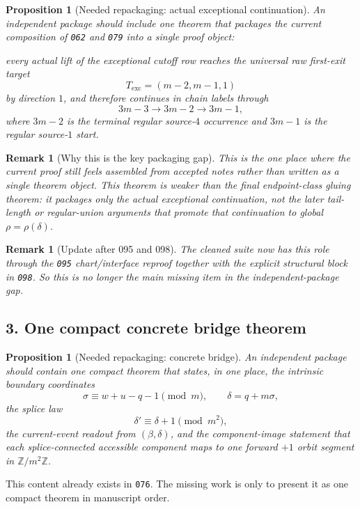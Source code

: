 \documentclass[11pt]{article}
\newtheorem{proposition}[theorem]{Proposition}
\newtheorem{remark}[theorem]{Remark}
\begin{document}
\begin{proposition}[Needed repackaging: actual exceptional continuation]
An independent package should include one theorem that packages the current
composition of \texttt{062} and \texttt{079} into a single proof object:

\smallskip
\noindent every actual lift of the exceptional cutoff row reaches the universal
raw first-exit target
\[
T_{\mathrm{exc}}=(m-2,m-1,1)
\]
by direction $1$, and therefore continues in chain labels through
\[
3m-3\to 3m-2\to 3m-1,
\]
where $3m-2$ is the terminal regular source-$4$ occurrence and $3m-1$ is the
regular source-$1$ start.
\end{proposition}

\begin{remark}[Why this is the key packaging gap]
This is the one place where the current proof still feels assembled from
accepted notes rather than written as a single theorem object. This theorem is
weaker than the final endpoint-class gluing theorem: it packages only the
actual exceptional continuation, not the later tail-length or regular-union
arguments that promote that continuation to global $\rho=\rho(\delta)$.
\end{remark}

\begin{remark}[Update after 095 and 098]
The cleaned suite now has this role through the \texttt{095} chart/interface
reproof together with the explicit structural block in \texttt{098}. So this is
no longer the main missing item in the independent-package gap.
\end{remark}

\subsection*{3. One compact concrete bridge theorem}

\begin{proposition}[Needed repackaging: concrete bridge]
An independent package should contain one compact theorem that states, in one
place, the intrinsic boundary coordinates
\[
\sigma\equiv w+u-q-1\pmod m,
\qquad
\delta=q+m\sigma,
\]
the splice law
\[
\delta' \equiv \delta+1 \pmod{m^2},
\]
the current-event readout from $(\beta,\delta)$, and the component-image
statement that each splice-connected accessible component maps to one forward
$+1$ orbit segment in $\mathbb Z/m^2\mathbb Z$.
\end{proposition}

This content already exists in \texttt{076}. The missing work is only to
present it as one compact theorem in manuscript order.
\end{document}
